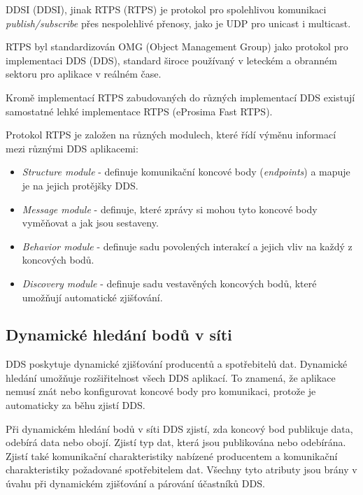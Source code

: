 \acs{DDSI} (\acl{DDSI}), jinak \acs{RTPS} (\acl{RTPS}) je protokol pro spolehlivou komunikaci \textit{publish/subscribe} přes nespolehlivé přenosy, jako je UDP pro unicast i multicast. \cite{DDS_Standard}

\acs{RTPS} byl standardizován OMG (Object Management Group) jako protokol pro implementaci \acl{DDS} (\acs{DDS}), standard široce používaný v leteckém a obranném sektoru pro aplikace v reálném čase.

Kromě implementací \acs{RTPS} zabudovaných do různých implementací \acs{DDS} existují samostatné lehké implementace \acs{RTPS} (eProsima Fast \acs{RTPS}).

Protokol RTPS je založen na různých modulech, které řídí výměnu informací mezi různými \acs{DDS} aplikacemi: \cite{Eprosima}

\begin{itemize}
    \item \textit{Structure module} - definuje komunikační koncové body (\textit{endpoints}) a mapuje je na jejich protějšky \acs{DDS}.
    \item \textit{Message module} - definuje, které zprávy si mohou tyto koncové body vyměňovat a jak jsou sestaveny.
    \item \textit{Behavior module} - definuje sadu povolených interakcí a jejich vliv na každý z koncových bodů.
    \item \textit{Discovery module} - definuje sadu vestavěných koncových bodů, které umožňují automatické zjišťování.
\end{itemize}

\subsection{Dynamické hledání bodů v síti}

\acs{DDS} poskytuje dynamické zjišťování producentů a spotřebitelů dat. Dynamické hledání umožňuje rozšiřitelnost všech \acs{DDS} aplikací. To znamená, že aplikace nemusí znát nebo konfigurovat koncové body pro komunikaci, protože je automaticky za běhu zjistí \acs{DDS}.

Při dynamickém hledání bodů v síti \acs{DDS} zjistí, zda koncový bod publikuje data, odebírá data nebo obojí. Zjistí typ dat, která jsou publikována nebo odebírána. Zjistí také komunikační charakteristiky nabízené producentem a komunikační charakteristiky požadované spotřebitelem dat. Všechny tyto atributy jsou brány v úvahu při dynamickém zjišťování a párování účastníků \acs{DDS}. \cite{DDS_Main}

